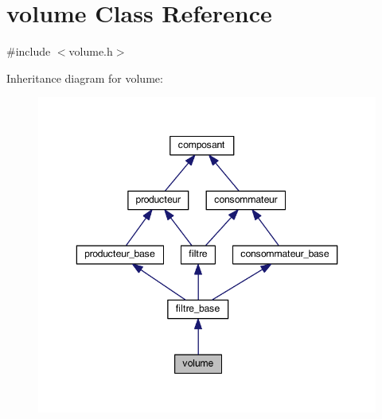 \hypertarget{classvolume}{\section{volume Class Reference}
\label{classvolume}
}


{\ttfamily \#include $<$volume.\-h$>$}



Inheritance diagram for volume\-:
\nopagebreak
\begin{figure}[H]
\begin{center}
\leavevmode
\includegraphics[width=346pt]{classvolume__inherit__graph}
\end{center}
\end{figure}


